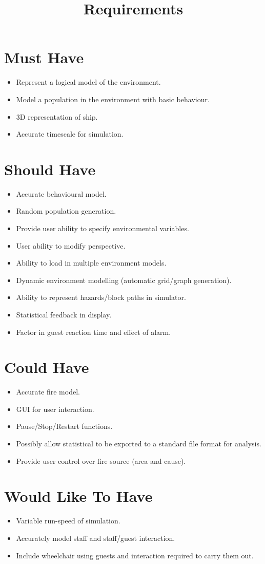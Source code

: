 \documentclass{article}
\title{Requirements}
\date{}
\begin{document}
\maketitle

\section{Must Have}
\begin{itemize}
\item{Represent a logical model of the environment.}
\item{Model a population in the environment with basic behaviour.}
\item{3D representation of ship.}
\item{Accurate timescale for simulation.}
 \end{itemize}
\section{Should Have}
\begin{itemize}
\item{Accurate behavioural model.}
\item{Random population generation.}
\item{Provide user ability to specify environmental variables.}
\item{User ability to modify perspective.}
\item{Ability to load in multiple environment models.}
\item{Dynamic environment modelling (automatic grid/graph generation).}
\item{Ability to represent hazards/block paths in simulator.}
\item{Statistical feedback in display.}
\item{Factor in guest reaction time and effect of alarm.}
\end{itemize}

\section{Could Have}
\begin{itemize}
\item{Accurate fire model.}
\item{GUI for user interaction.}
\item{Pause/Stop/Restart functions.}
\item{Possibly allow statistical to be exported to a standard file format for analysis.}
\item{Provide user control over fire source (area and cause).}
\end{itemize}

\section{Would Like To Have}
\begin{itemize}
\item{Variable run-speed of simulation.}
\item{Accurately model staff and staff/guest interaction.}
\item{Include wheelchair using guests and interaction required to carry them out.}
\end{itemize}
\end{document}
